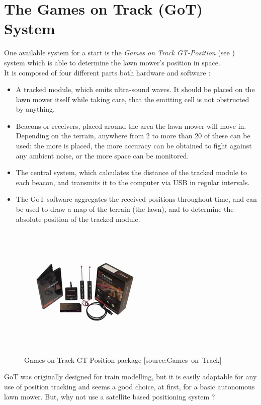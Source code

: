 \section{The Games on Track (GoT) System}
One available system for a start is the \emph{Games on Track GT-Position} (see ) system which is able to determine the lawn mower's position in space.\\
%
It is composed of four different parts both hardware and software \cite{GOTWebsitePos} :
\begin{itemize}
	\item A tracked module, which emits ultra-sound waves. It should be placed on the lawn mower itself while taking care, that the emitting cell is not obstructed by anything.
	\item Beacons or receivers, placed around the area the lawn mower will move in. Depending on the terrain, anywhere from 2 to more than 20 of these can be used: the more is placed, the more accuracy can be obtained to fight against any ambient noise, or the more space can be monitored.
	\item The central system, which calculates the distance of the tracked module to each beacon, and transmits it to the computer via USB in regular intervals.
	\item The GoT software aggregates the received positions throughout time, and can be used to draw a map of the terrain (the lawn), and to determine the absolute position of the tracked module.
\end{itemize}

\begin{figure}[H]
\centering
\includegraphics[scale=1.1]{figures/gotSystem.jpg} 
\caption{Games on Track GT-Position package [source:Games\ on\ Track]} 
\label{fig:gotsystem}
\end{figure}
\noindent

GoT was originally designed for train modelling, but it is easily adaptable for any use of position tracking and seems a good choice, at first, for a basic autonomous lawn mower.
But, why not use a satellite based positioning system ?
